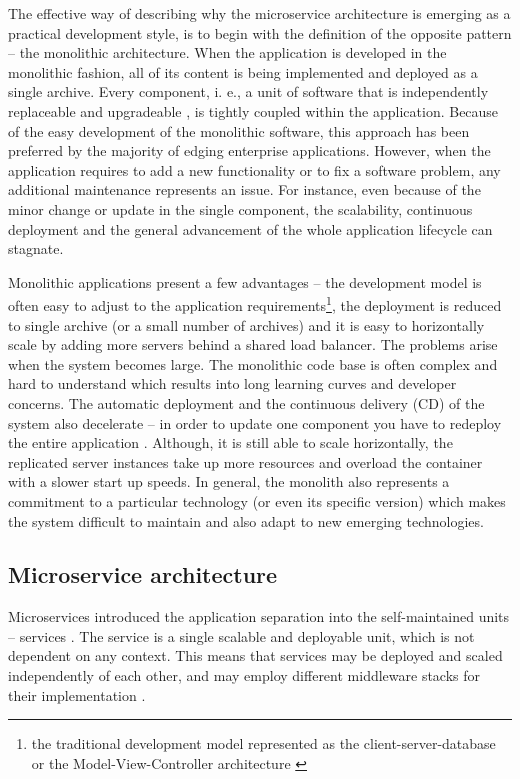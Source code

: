 \documentclass[oneside,
  digital, %
  table,   %
  lof,     %
  lot,     %
]{fithesis3}
\begin{document}
The effective way of describing why the microservice architecture is emerging as a practical development style, is to begin with the definition of the opposite pattern -- the monolithic architecture. When the application is developed in the monolithic fashion, all of its content is being implemented and deployed as a single archive. Every component, i. e., a unit of software that is independently replaceable and upgradeable \cite{microservices}, is tightly coupled within the application. Because of the easy development of the monolithic software, this approach has been preferred by the majority of edging enterprise applications. However, when the application requires to add a new functionality or to fix a software problem, any additional maintenance represents an issue. For instance, even because of the minor change or update in the single component, the scalability, continuous deployment and the general advancement of the whole application lifecycle can stagnate. 

Monolithic applications present a few advantages -- the development model is often easy to adjust to the application requirements\footnote{the traditional development model represented as the client-server-database or the Model-View-Controller architecture \cite{mvn_architecture}}, the deployment is reduced to single archive (or a small number of archives) and it is easy to horizontally scale by adding more servers behind a shared load balancer. The problems arise when the system becomes large. The monolithic code base is often complex and hard to understand which results into long learning curves \cite{learning_curve} and developer concerns. The automatic deployment and the continuous delivery (CD) of the system also decelerate -- in order to update one component you have to redeploy the entire application \cite{monolithic_arch}. Although, it is still able to scale horizontally, the replicated server instances take up more resources and overload the container with a slower start up speeds. In general, the monolith also represents a commitment to a particular technology (or even its specific version) which makes the system difficult to maintain and also adapt to new emerging technologies.


\subsection{Microservice architecture}

Microservices introduced the application separation into the self-maintained units – services \cite{intro_to_microservices}. The service is a single scalable and deployable unit, which is not dependent on any context. This means that services may be deployed and scaled independently of each other, and may employ different middleware   stacks for their implementation \cite{ms_arch_ecommerce}. 
\end{document}
